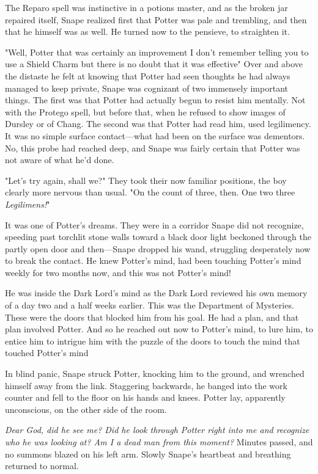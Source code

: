 The Reparo spell was instinctive in a potions master, and as the broken jar repaired itself, Snape realized first that Potter was pale and trembling, and then that he himself was as well. He turned now to the pensieve, to straighten it.

"Well, Potter{\el} that was certainly an improvement{\el} I don't remember telling you to use a Shield Charm{\el} but there is no doubt that it was effective{\el}" Over and above the distaste he felt at knowing that Potter had seen thoughts he had always managed to keep private, Snape was cognizant of two immensely important things. The first was that Potter had actually begun to resist him mentally. Not with the Protego spell, but before that, when he refused to show images of Dursley or of Chang. The second was that Potter had read him, used legilimency. It was no simple surface contact—what had been on the surface was dementors. No, this probe had reached deep, and Snape was fairly certain that Potter was not aware of what he'd done.

"Let's try again, shall we?" They took their now familiar positions, the boy clearly more nervous than usual. "On the count of three, then. One{\el} two{\el} three{\el} \emph{Legilimens!}"

It was one of Potter's dreams. They were in a corridor Snape did not recognize, speeding past torchlit stone walls toward a black door{\el} light beckoned through the partly open door{\el} and then—Snape dropped his wand, struggling desperately now to break the contact. He knew Potter's mind, had been touching Potter's mind weekly for two months now, and this was not Potter's mind!

He was inside the Dark Lord's mind as the Dark Lord reviewed his own memory of a day two and a half weeks earlier. This was the Department of Mysteries. These were the doors that blocked him from his goal. He had a plan, and that plan involved Potter. And so he reached out now to Potter's mind, to lure him, to entice him{\el} to intrigue him with the puzzle of the doors{\el} to touch the mind that touched Potter's mind{\el}

In blind panic, Snape struck Potter, knocking him to the ground, and wrenched himself away from the link. Staggering backwards, he banged into the work counter and fell to the floor on his hands and knees. Potter lay, apparently unconscious, on the other side of the room.

\emph{Dear God, did he see me? Did he look through Potter right into me and recognize who he was looking at? Am I a dead man from this moment?} Minutes passed, and no summons blazed on his left arm. Slowly Snape's heartbeat and breathing returned to normal.

